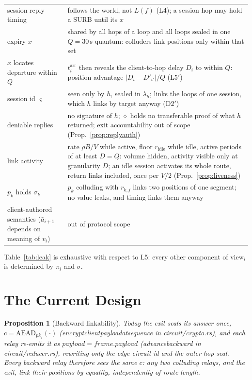 \documentclass[journal]{IEEEtran}
\newtheorem{proposition}{Proposition}
\newcommand{\cl}{\diamond}
\newcommand{\view}{\mathrm{view}}
\newcommand{\arr}{t^{\mathrm{arr}}}
\newcommand{\sid}{\varsigma}
\DeclareRobustCommand{\code}[1]{{\ttfamily\renewcommand{\_}{\textunderscore\allowbreak}#1}}
\begin{document}
\begin{table}[t]
\begin{tabular}{@{}>{\raggedright\arraybackslash}p{}>{\raggedright\arraybackslash}p{}@{}}
session reply timing & follows the world, not $L(f)$ (L4); a session hop may hold a SURB until its $x$ \\
expiry $x$ & shared by all hops of a loop and all loops sealed in one $Q=30$\,s quantum: colluders link positions only within that set \\
$x$ locates departure within $Q$ & $\arr_i$ then reveals the client-to-hop delay $D_i$ to within $Q$: position advantage $|D_i-D'_{i'}|/Q$ (L5$'$) \\
session id $\sid$ & seen only by $h$, sealed in $\lambda_h$; links the loops of one session, which $h$ links by target anyway (D2$'$) \\
deniable replies & no signature of $h$; $\cl$ holds no transferable proof of what $h$ returned; exit accountability out of scope (Prop.~\ref{prop:replyauth}) \\
link activity & rate $\rho B/V$ while active, floor $r_{\mathrm{idle}}$ while idle, active periods of at least $D=Q$: volume hidden, activity visible only at granularity $D$; an idle session activates its whole route, return links included, once per $V/2$ (Prop.~\ref{prop:liveness}) \\
$p_k$ holds $\sigma_k$ & $p_k$ colluding with $r_{k,j}$ links two positions of one segment; no value leaks, and timing links them anyway \\
client-authored semantics ($\bar a_{i+1}$ depends on meaning of $v_i$) & out of protocol scope \\
\bottomrule
\end{tabular}
\end{table}

Table~\ref{tab:leak} is exhaustive with respect to L5: every other
component of $\view_i$ is determined by $\pi_i$ and $\sigma$.

\section{The Current Design}\label{sec:current}

\begin{proposition}[Backward linkability]\label{prop:current}
Today the exit seals its answer once,
$c=\mathrm{AEAD}_{\mathit{pk}_\cl}(\cdot)$
(\code{encrypt\_client\_payload\_at\_sequence} in
\code{circuit/crypto.rs}), and each relay re-emits it as
$\mathit{payload}=\mathit{frame.payload}$ (\code{advance\_backward} in
\code{circuit/reducer.rs}), rewriting only the edge circuit id and the
outer hop seal.  Every backward relay therefore sees the
same $c$: any two colluding relays, and the exit, link their positions by
equality, independently of route length.
\end{proposition}
\end{document}

